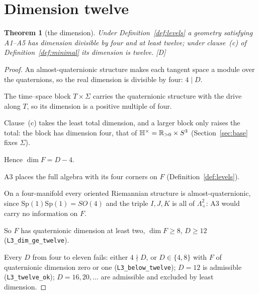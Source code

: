 \documentclass[11pt,a4paper]{article}
\theoremstyle{plain}
\newtheorem{theorem}{Theorem}[section]
\theoremstyle{definition}
\theoremstyle{remark}
\newcommand{\Hquat}{\mathbb{H}}
\newcommand{\rigD}{[\textup{D}]}
\begin{document}
\section{Dimension twelve}\label{sec:dimension}

\begin{theorem}[the dimension]\label{thm:dim}
Under Definition~\ref{def:levels} a geometry satisfying A1--A5 has dimension divisible by four and at least twelve; under clause~(c) of Definition~\ref{def:minimal} its dimension is twelve. \rigD
\end{theorem}

\begin{proof}
An almost-quaternionic structure makes each tangent space a module over the quaternions, so the real dimension is divisible by four: $4\mid D$.

The time--space block $T\times\Sigma$ carries the quaternionic structure with the drive along $T$, so its dimension is a positive multiple of four.

Clause~(c) takes the least total dimension, and a larger block only raises the total: the block has dimension four, that of $\Hquat^{\times}=\R_{>0}\times S^{3}$ (Section~\ref{sec:base} fixes $\Sigma$).

Hence $\dim F=D-4$.

A3 places the full algebra with its four corners on $F$ (Definition~\ref{def:levels}).

On a four-manifold every oriented Riemannian structure is almost-quaternionic, since $\mathrm{Sp}(1)\mathrm{Sp}(1)=SO(4)$ and the triple $I,J,K$ is all of $\Lambda^{2}_{+}$: A3 would carry no information on $F$.

So $F$ has quaternionic dimension at least two, $\dim F\geq8$, $D\geq12$ (\texttt{L3\_dim\_ge\_twelve}).

Every $D$ from four to eleven fails: either $4\nmid D$, or $D\in\{4,8\}$ with $F$ of quaternionic dimension zero or one (\texttt{L3\_below\_twelve}); $D=12$ is admissible (\texttt{L3\_twelve\_ok}); $D=16,20,\dots$ are admissible and excluded by least dimension.
\end{proof}
\end{document}
